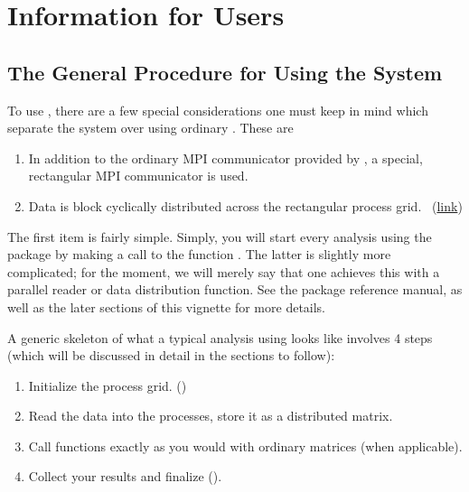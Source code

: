 \section[]{Information for Users}

\subsection[]{The General Procedure for Using the System}\label{sec:basic_steps}

To use , there are a few special considerations one must keep in mind which separate the system over using ordinary .  These are
\begin{enumerate}
 \item In addition to the ordinary MPI communicator provided by , a special, rectangular MPI communicator is used.~\citep{blug}
 \item Data is block cyclically distributed across the rectangular process grid.~\citep{slug} (\href{http://netlib.org/scalapack/slug/node75.html}{link})
\end{enumerate}

The first item is fairly simple.  Simply, you will start every analysis using the  package by making a call to the function .  The latter is slightly more complicated; for the moment, we will merely say that one achieves this with a parallel reader or data distribution function.  See the package reference manual, as well as the later sections of this vignette for more details.

A generic skeleton of what a typical analysis using  looks like involves 4 steps (which will be discussed in detail in the sections to follow):

\begin{enumerate}
\item Initialize the process grid. ()
\item Read the data into the processes, store it as a distributed matrix.
\item Call  functions exactly as you would with ordinary matrices (when applicable).
\item Collect your results and finalize ().
\end{enumerate}

